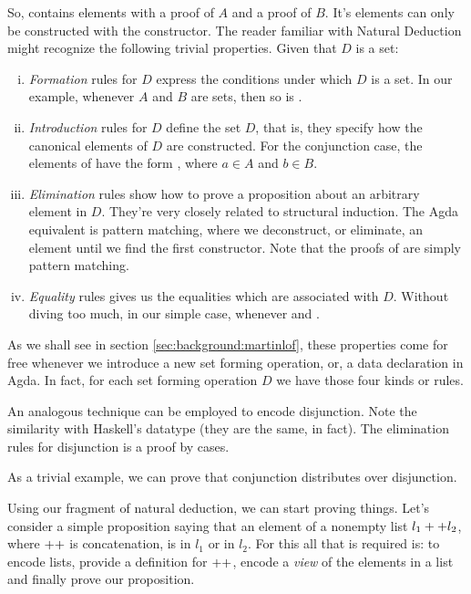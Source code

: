 
So,  contains elements with a proof of $A$ and a proof of $B$. It's elements
can only be constructed with the \IC{<\_,\_>} constructor. The reader familiar with Natural Deduction
might recognize the following trivial properties. Given that $D$ is a set:

\begin{enumerate}[i)]
  \item \emph{Formation} rules for $D$ express the conditions under which $D$ is a set.
        In our example, whenever $A$ and $B$ are sets, then so is .
  \item \emph{Introduction} rules for $D$ define the set $D$, that is, they specify how the
        canonical elements of $D$ are constructed. For the conjunction case, 
        the elements of  have the form , where $a \in A$
        and $b \in B$. 
  \item \emph{Elimination} rules show how to prove a proposition about an arbitrary element in $D$.
        They're very closely related to structural induction. The Agda equivalent is pattern matching,
        where we deconstruct, or eliminate, an element until we find the first constructor. Note that
        the proofs of  are simply pattern matching.
  \item \emph{Equality} rules gives us the equalities which are associated with $D$. Without diving
        too much, in our simple case,  whenever 
        and .
\end{enumerate}

As we shall see in section \ref{sec:background:martinlof}, these properties come for free whenever we introduce 
a new set forming operation, or, a data declaration in Agda. In fact, for each set forming operation $D$
we have those four kinds or rules.

An analogous technique can be employed to encode disjunction. Note the similarity with
Haskell's  datatype (they are the same, in fact). The elimination rules for
disjunction is a proof by cases. 


As a trivial example, we can prove that conjunction distributes
over disjunction.


Using our fragment of natural deduction, we can start proving things. Let's consider a simple
proposition saying that an element of a nonempty list $l_1 ++ l_2$, where $++$ is concatenation, is
in $l_1$ or in $l_2$. For this all that is required is: to encode lists, provide a definition for $++$,
encode a \emph{view} of the elements in a list and finally prove our proposition.

